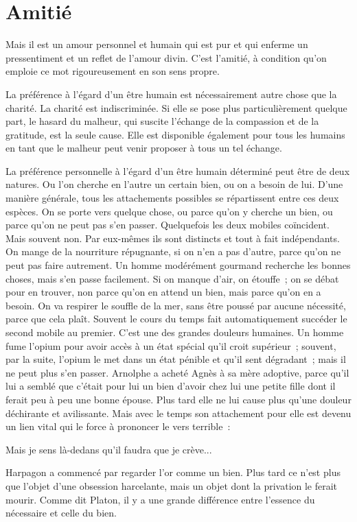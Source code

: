 \documentclass[french,twoside]{book} %
\begin{document}
\section[Amitié]{Amitié}
\noindent Mais il est un amour personnel et humain qui est pur et qui enferme un pressentiment et un reflet de l'amour divin. C'est l'amitié, à condition qu'on emploie ce mot rigoureusement en son sens propre.\par
La préférence à l'égard d'un être humain est nécessairement autre chose que la charité. La charité est indiscriminée. Si elle se pose plus particulièrement quelque part, le hasard du malheur, qui suscite l'échange de la compassion et de la gratitude, est la seule cause. Elle est disponible également pour tous les humains en tant que le malheur peut venir proposer à tous un tel échange.\par
La préférence personnelle à l'égard d'un être humain déterminé peut être de deux natures. Ou l'on cherche en l'autre un certain bien, ou on a besoin de lui. D'une manière générale, tous les attachements possibles se répartissent entre ces deux espèces. On se porte vers quelque chose, ou parce qu'on y cherche un bien, ou parce qu'on ne peut pas s'en passer. Quelquefois les deux mobiles coïncident. Mais souvent non. Par eux-mêmes ils sont distincts et tout à fait indépendants. On mange de la nourriture répugnante, si on n'en a pas d'autre, parce qu'on ne peut pas faire autrement. Un homme modérément gourmand recherche les bonnes choses, mais s'en passe facilement. Si on manque d'air, on étouffe ; on se débat pour en trouver, non parce qu'on en attend un bien, mais parce qu'on en a besoin. On va respirer le souffle de la mer, sans être poussé par aucune nécessité, parce que cela plaît. Souvent le cours du temps fait automatiquement succéder le second mobile au premier. C'est une des grandes douleurs humaines. Un homme fume l'opium pour avoir accès à un état spécial qu'il croit supérieur ; souvent, par la suite, l'opium le met dans un état pénible et qu'il sent dégradant ; mais il ne peut plus s'en passer. Arnolphe a acheté Agnès à sa mère adoptive, parce qu'il lui a semblé que c'était pour lui un bien d'avoir chez lui une petite fille dont il ferait peu à peu une bonne épouse. Plus tard elle ne lui cause plus qu'une douleur déchirante et avilissante. Mais avec le temps son attachement pour elle est devenu un lien vital qui le force à prononcer le vers terrible :\par
Mais je sens là-dedans qu'il faudra que je crève...\par
Harpagon a commencé par regarder l'or comme un bien. Plus tard ce n'est plus que l'objet d'une obsession harcelante, mais un objet dont la privation le ferait mourir. Comme dit Platon, il y a une grande différence entre l'essence du nécessaire et celle du bien.\par
\end{document}

